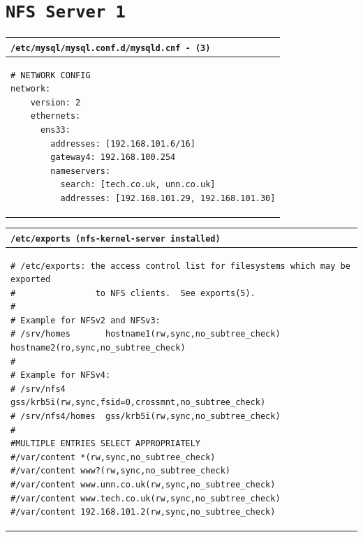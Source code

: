 \documentclass[11pt]{article}
\begin{document}
\clearpage

\section{\texttt{NFS Server 1}}
\begin{table}[ht]
    \begin{tabular}{|p{17.7cm}|} 
        \hline
    \texttt{\textbf{/etc/mysql/mysql.conf.d/mysqld.cnf} - (\texttt{3})}\\ 
        \hline
        \lstset{
                basicstyle=\scriptsize\ttfamily,
        }
            \begin{lstlisting}
# NETWORK CONFIG
network:
    version: 2
    ethernets:
      ens33:
        addresses: [192.168.101.6/16]
        gateway4: 192.168.100.254
        nameservers:
          search: [tech.co.uk, unn.co.uk]
          addresses: [192.168.101.29, 192.168.101.30]
            \end{lstlisting}\\
        \hline
    \end{tabular}
\end{table}

\begin{table}[ht]
    \begin{tabular}{|p{17.7cm}|} 
        \hline
    \texttt{\textbf{/etc/exports (nfs-kernel-server installed)}}\\ 
        \hline
        \lstset{
                basicstyle=\scriptsize\ttfamily,
        }
            \begin{lstlisting}
# /etc/exports: the access control list for filesystems which may be exported
#                to NFS clients.  See exports(5).
#
# Example for NFSv2 and NFSv3:
# /srv/homes       hostname1(rw,sync,no_subtree_check) hostname2(ro,sync,no_subtree_check)
#
# Example for NFSv4:
# /srv/nfs4        gss/krb5i(rw,sync,fsid=0,crossmnt,no_subtree_check)
# /srv/nfs4/homes  gss/krb5i(rw,sync,no_subtree_check)
#
#MULTIPLE ENTRIES SELECT APPROPRIATELY
#/var/content *(rw,sync,no_subtree_check)
#/var/content www?(rw,sync,no_subtree_check)
#/var/content www.unn.co.uk(rw,sync,no_subtree_check)
#/var/content www.tech.co.uk(rw,sync,no_subtree_check)
#/var/content 192.168.101.2(rw,sync,no_subtree_check)
            \end{lstlisting}\\
        \hline
    \end{tabular}
\end{table}

\clearpage
\end{document}
